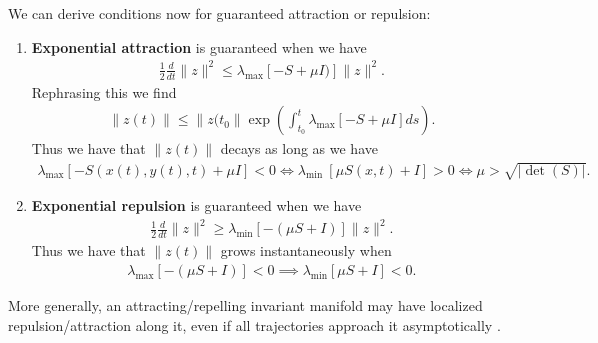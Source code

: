 \begin{ex}
We can derive conditions now for guaranteed attraction or repulsion:
\begin{enumerate}
	\item \textbf{Exponential attraction} is guaranteed when we have
		\begin{align}
			\frac{1}{2} \frac{d}{dt}\| z\| ^{2} \leq \lambda_{ \textrm{max} } \left[ - S + \mu I) \right] \|z \|^{2}.
		\end{align}
		Rephrasing this we find
		\begin{align}
			\| z(t) \| \leq \| z(t_0\| \exp\left( \int_{t_0}^{t} \lambda_{ \textrm{max} }[-S + \mu I ]ds \right).
		\end{align}
		Thus we have that $\|z(t)\|$ decays as long as we have
		\begin{align}
			\lambda_{ \textrm{max} }\left[ - S(x(t), y(t), t) + \mu I \right] < 0 
			\Leftrightarrow 
			\lambda _{ \textrm{min } } \left[ \mu S(x,t) + I \right] >0
			\Leftrightarrow
			\mu  > \sqrt{|\det(S)|}.
		\end{align}
	\item \textbf{Exponential repulsion} is guaranteed when we have  	
		\begin{align}
			\frac{1}{2} \frac{d}{dt}\| z\| ^{2} \geq \lambda_{ \textrm{min} } \left[ - (\mu S + I) \right] \|z \|^{2}.
		\end{align}
		Thus we have that $\|z(t)\|$ grows instantaneously when
		\begin{align}
			\lambda_{ \textrm{max} }\left[  -(\mu S +  I) \right] < 0 \implies \lambda _{ \textrm{min} } \left[\mu S + I \right] < 0. 
		\end{align}
\end{enumerate}

More generally, an attracting/repelling invariant manifold may have localized repulsion/attraction along it, even if all trajectories approach it asymptotically \cite{Sapsis2010}.
\end{ex}

